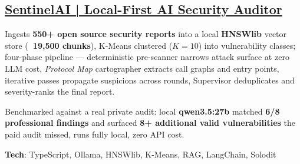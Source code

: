 \documentclass[letter,10pt]{article}
\begin{document}




\subsection{{\href{https://github.com/JustUzair/open-source-local-auditor}{SentinelAI | Local-First AI Security Auditor}}}
\begin{zitemize}
  \item Ingests \textbf{550+ open source security reports} into a local \textbf{HNSWlib} vector store (\textbf{~19,500 chunks}), K-Means clustered ($K=10$) into vulnerability classes; four-phase pipeline — deterministic pre-scanner narrows attack surface at zero LLM cost, \textit{Protocol Map} cartographer extracts call graphs and entry points, iterative passes propagate suspicions across rounds, Supervisor deduplicates and severity-ranks the final report.
  \item Benchmarked against a real private audit: local \textbf{qwen3.5:27b} matched \textbf{6/8 professional findings} and surfaced \textbf{8+ additional valid vulnerabilities} the paid audit missed, runs fully local, zero API cost.
  \item \textbf{Tech}: TypeScript, Ollama, HNSWlib, K-Means, RAG, LangChain, Solodit
\end{zitemize}
\end{document}
